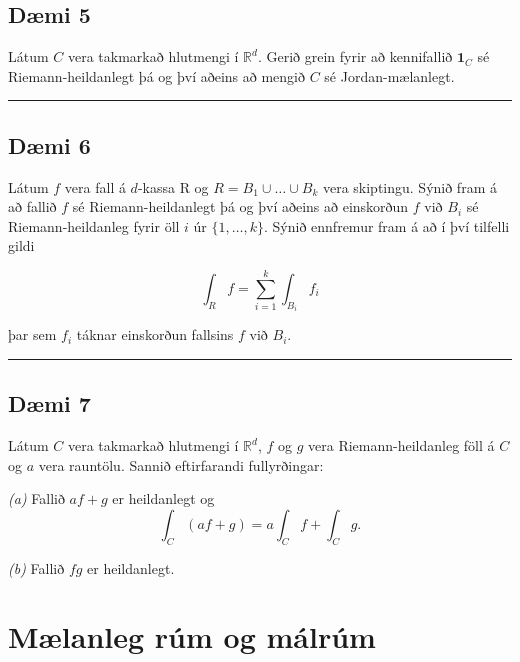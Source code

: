 \documentclass[]{book}
\begin{document}
\hypertarget{dmi-5-2}{%
\section*{Dæmi 5}\label{dmi-5-2}}

Látum \(C\) vera takmarkað hlutmengi í \(\mathbb R^d\). Gerið grein fyrir að kennifallið \(\mathbf 1_C\) sé Riemann-heildanlegt þá og því aðeins að mengið \(C\) sé Jordan-mælanlegt.

\begin{center}\rule{0.5\linewidth}{\linethickness}\end{center}

\hypertarget{dmi-6-2}{%
\section*{Dæmi 6}\label{dmi-6-2}}

Látum \(f\) vera fall á \(d\)-kassa R og \(R = B_1\cup\dots\cup B_k\) vera skiptingu. Sýnið fram á að fallið \(f\) sé Riemann-heildanlegt þá og því aðeins að einskorðun \(f\) við \(B_i\) sé Riemann-heildanleg fyrir öll \(i\) úr \(\{1, \dots, k\}\). Sýnið ennfremur fram á að í því tilfelli gildi

\[
\int_R f = \sum_{i=1}^k\int_{B_i}f_i
\]

þar sem \(f_i\) táknar einskorðun fallsins \(f\) við \(B_i\).

\begin{center}\rule{0.5\linewidth}{\linethickness}\end{center}

\hypertarget{dmi-7-1}{%
\section*{Dæmi 7}\label{dmi-7-1}}

Látum \(C\) vera takmarkað hlutmengi í \(\mathbb R^d\), \(f\) og \(g\) vera Riemann-heildanleg föll á \(C\) og \(a\) vera rauntölu. Sannið eftirfarandi fullyrðingar:

\emph{(a)} Fallið \(af + g\) er heildanlegt og
\[
\int_C(af + g) = a\int_Cf + \int_C g.
\]

\emph{(b)} Fallið \(fg\) er heildanlegt.

\hypertarget{mlanleg-rum-og-malrum}{%
\chapter{Mælanleg rúm og málrúm}\label{mlanleg-rum-og-malrum}}
\end{document}
